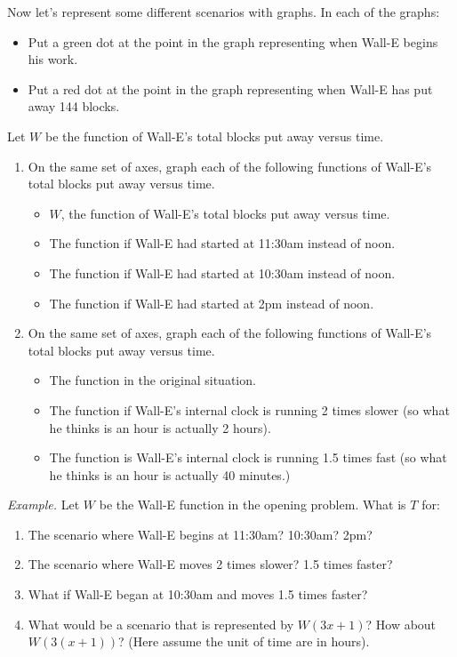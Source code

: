 \documentclass[11pt]{article}
\newenvironment{task}
	{\begin{mdframed}[linecolor=lightgray, linewidth=3pt]\raggedright}
	{\end{mdframed}}
\theoremstyle{definition}
\begin{document}
\begin{task}
Now let's represent some different scenarios with graphs. In each of the graphs:
	\vspace*{-4pt}\begin{itemize}
	\item Put a green dot at the point in the graph representing when Wall-E begins his work. 
	\item Put a red dot at the point in the graph representing when Wall-E has put away 144 blocks. 
 	\end{itemize}
 Let $W$ be the function of Wall-E's total blocks put away versus time. 
\begin{enumerate}
\item On the same set of axes, graph each of the following functions of Wall-E's total blocks put away versus time. 
	\begin{itemize}
	\item $W$, the function of Wall-E's total blocks put away versus time. 
	\item The function if Wall-E had started at 11:30am instead of noon. 
	\item The function if Wall-E had started at 10:30am instead of noon.
	\item  The function if Wall-E had started at 2pm instead of noon.
	\end{itemize}
\item On the same set of axes, graph each of the following functions of Wall-E's total blocks put away versus time.
	\begin{itemize}
	\item The function in the original situation.
	\item The function if Wall-E's internal clock is running 2 times slower (so what he thinks is an hour is actually 2 hours).
	\item The function is Wall-E's internal clock is running 1.5 times fast (so what he thinks is an hour is actually 40 minutes.)
	\end{itemize}
\end{enumerate}
\end{task}


{\it Example.} Let $W$ be the Wall-E function in the opening problem. What is $T$ for:
	\begin{enumerate}[label=(\alph*)]
	\item The scenario where Wall-E begins at 11:30am? 10:30am? 2pm?
	\item The scenario where Wall-E moves 2 times slower? 1.5 times faster?
	\item What if Wall-E began at 10:30am and moves 1.5 times faster?
	\item What would be a scenario that is represented by $W(3x+1)$? How about $W(3(x+1))$? (Here assume the unit of time are in hours).
	\end{enumerate}
	
\end{document}
